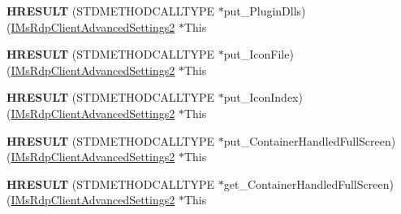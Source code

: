 \begin{DoxyCompactItemize}
\mbox{\label{struct_m_s_t_s_c_lib_1_1_i_ms_rdp_client_advanced_settings2_vtbl_a2c3f1a933ab2dbae30227652f24d29ca}} 
{\bfseries H\+R\+E\+S\+U\+LT} (S\+T\+D\+M\+E\+T\+H\+O\+D\+C\+A\+L\+L\+T\+Y\+PE $\ast$put\+\_\+\+Plugin\+Dlls)(\hyperlink{interface_m_s_t_s_c_lib_1_1_i_ms_rdp_client_advanced_settings2}{I\+Ms\+Rdp\+Client\+Advanced\+Settings2} $\ast$This
\item 
\mbox{\label{struct_m_s_t_s_c_lib_1_1_i_ms_rdp_client_advanced_settings2_vtbl_af8f2dbddaca993cf7e886511a4077e02}} 
{\bfseries H\+R\+E\+S\+U\+LT} (S\+T\+D\+M\+E\+T\+H\+O\+D\+C\+A\+L\+L\+T\+Y\+PE $\ast$put\+\_\+\+Icon\+File)(\hyperlink{interface_m_s_t_s_c_lib_1_1_i_ms_rdp_client_advanced_settings2}{I\+Ms\+Rdp\+Client\+Advanced\+Settings2} $\ast$This
\item 
\mbox{\label{struct_m_s_t_s_c_lib_1_1_i_ms_rdp_client_advanced_settings2_vtbl_a338215f5747db1e2be9876301db732c4}} 
{\bfseries H\+R\+E\+S\+U\+LT} (S\+T\+D\+M\+E\+T\+H\+O\+D\+C\+A\+L\+L\+T\+Y\+PE $\ast$put\+\_\+\+Icon\+Index)(\hyperlink{interface_m_s_t_s_c_lib_1_1_i_ms_rdp_client_advanced_settings2}{I\+Ms\+Rdp\+Client\+Advanced\+Settings2} $\ast$This
\item 
\mbox{\label{struct_m_s_t_s_c_lib_1_1_i_ms_rdp_client_advanced_settings2_vtbl_a462c89c95947ae80ce1aa149058680de}} 
{\bfseries H\+R\+E\+S\+U\+LT} (S\+T\+D\+M\+E\+T\+H\+O\+D\+C\+A\+L\+L\+T\+Y\+PE $\ast$put\+\_\+\+Container\+Handled\+Full\+Screen)(\hyperlink{interface_m_s_t_s_c_lib_1_1_i_ms_rdp_client_advanced_settings2}{I\+Ms\+Rdp\+Client\+Advanced\+Settings2} $\ast$This
\item 
\mbox{\label{struct_m_s_t_s_c_lib_1_1_i_ms_rdp_client_advanced_settings2_vtbl_ae155e608834d1f7a37dcfb8d0503de98}} 
{\bfseries H\+R\+E\+S\+U\+LT} (S\+T\+D\+M\+E\+T\+H\+O\+D\+C\+A\+L\+L\+T\+Y\+PE $\ast$get\+\_\+\+Container\+Handled\+Full\+Screen)(\hyperlink{interface_m_s_t_s_c_lib_1_1_i_ms_rdp_client_advanced_settings2}{I\+Ms\+Rdp\+Client\+Advanced\+Settings2} $\ast$This
\item 
\mbox{\label{struct_m_s_t_s_c_lib_1_1_i_ms_rdp_client_advanced_settings2_vtbl_ab73d09baa4c41785f2ff39738fc640e7}} 

\end{DoxyCompactItemize}

